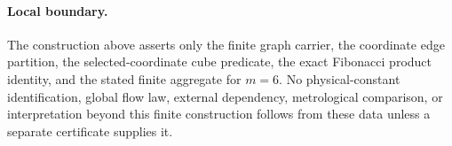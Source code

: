 \paragraph{Local boundary.}
The construction above asserts only the finite graph carrier, the coordinate edge partition, the selected-coordinate cube predicate, the exact Fibonacci product identity, and the stated finite aggregate for $m=6$. No physical-constant identification, global flow law, external dependency, metrological comparison, or interpretation beyond this finite construction follows from these data unless a separate certificate supplies it.
